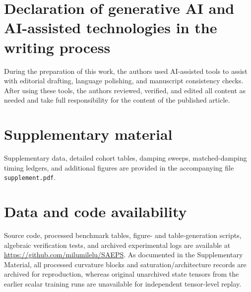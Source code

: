 \documentclass[preprint,11pt]{elsarticle}
\begin{document}
\section*{Declaration of generative AI and AI-assisted technologies in the writing process}
During the preparation of this work, the authors used AI-assisted tools to assist with editorial drafting, language polishing, and manuscript consistency checks.
After using these tools, the authors reviewed, verified, and edited all content as needed and take full responsibility for the content of the published article.

\section*{Supplementary material}
Supplementary data, detailed cohort tables, damping sweeps, matched-damping timing ledgers, and additional figures are provided in the accompanying file \texttt{supplement.pdf}.

\section*{Data and code availability}
Source code, processed benchmark tables, figure- and table-generation scripts, algebraic verification tests, and archived experimental logs are available at \url{https://github.com/milumilelu/SAEPS}.
As documented in the Supplementary Material, all processed curvature blocks and saturation/architecture records are archived for reproduction, whereas original unarchived state tensors from the earlier scalar training runs are unavailable for independent tensor-level replay.
\end{document}
